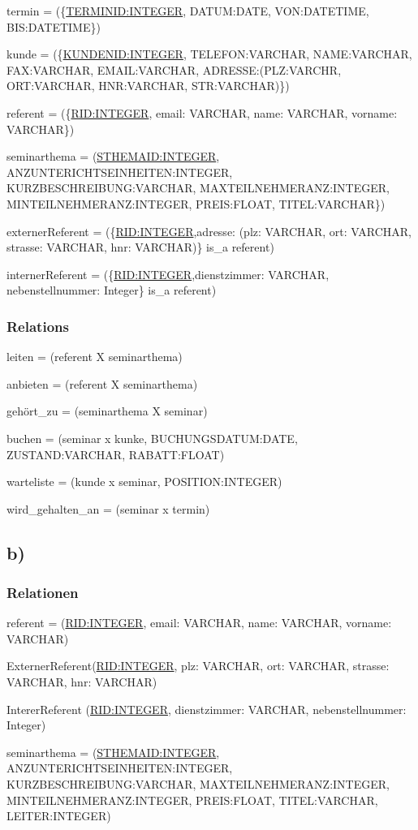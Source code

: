 \documentclass[10pt,a4paper]{report}
\begin{document}
termin  = (\{\underline{TERMINID:INTEGER}, DATUM:DATE, VON:DATETIME, BIS:DATETIME\})

kunde   = (\{\underline{KUNDENID:INTEGER}, TELEFON:VARCHAR, NAME:VARCHAR, FAX:VARCHAR, EMAIL:VARCHAR, ADRESSE:(PLZ:VARCHR, ORT:VARCHAR, HNR:VARCHAR, STR:VARCHAR)\})

referent = (\{\underline{RID:INTEGER}, email: VARCHAR, name: VARCHAR, vorname: VARCHAR\})

seminarthema = (\underline{STHEMAID:INTEGER}, ANZUNTERICHTSEINHEITEN:INTEGER, KURZBESCHREIBUNG:VARCHAR, MAXTEILNEHMERANZ:INTEGER, MINTEILNEHMERANZ:INTEGER, PREIS:FLOAT, TITEL:VARCHAR\})

externerReferent = (\{\underline{RID:INTEGER},adresse: (plz: VARCHAR, ort: VARCHAR, strasse: VARCHAR, hnr: VARCHAR)\} is\_a referent)

internerReferent = (\{\underline{RID:INTEGER},dienstzimmer: VARCHAR, nebenstellnummer: Integer\} is\_a referent)

\subsubsection{Relations}

leiten = (referent X seminarthema)

anbieten = (referent X seminarthema)

gehört\_zu = (seminarthema X seminar)

buchen = (seminar x kunke, BUCHUNGSDATUM:DATE, ZUSTAND:VARCHAR, RABATT:FLOAT)

warteliste = (kunde x seminar, POSITION:INTEGER)

wird\_gehalten\_an = (seminar x termin)


\subsection{b)}
\subsubsection{Relationen}
referent = (\underline{RID:INTEGER}, email: VARCHAR, name: VARCHAR, vorname: VARCHAR)

ExternerReferent(\underline{RID:INTEGER}, plz: VARCHAR, ort: VARCHAR, strasse: VARCHAR, hnr: VARCHAR)

IntererReferent (\underline{RID:INTEGER}, dienstzimmer: VARCHAR, nebenstellnummer: Integer) 

seminarthema = (\underline{STHEMAID:INTEGER}, ANZUNTERICHTSEINHEITEN:INTEGER, KURZBESCHREIBUNG:VARCHAR, MAXTEILNEHMERANZ:INTEGER, MINTEILNEHMERANZ:INTEGER, PREIS:FLOAT, TITEL:VARCHAR, LEITER:INTEGER)
\end{document}
